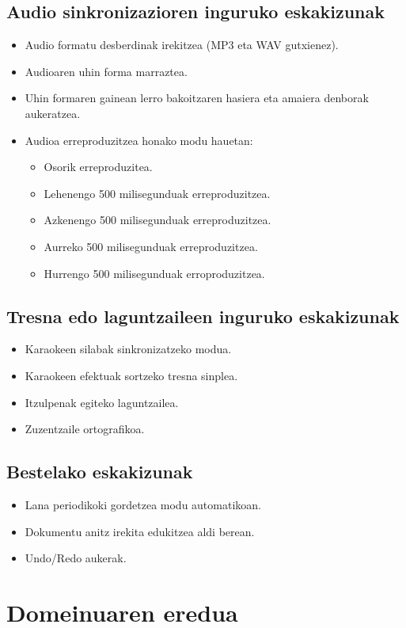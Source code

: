 \subsection{Audio sinkronizazioren inguruko eskakizunak}
\begin{itemize}
\item Audio formatu desberdinak irekitzea (MP3 eta WAV gutxienez).
\item Audioaren uhin forma marraztea.
\item Uhin formaren gainean lerro bakoitzaren hasiera eta amaiera denborak aukeratzea.
\item Audioa erreproduzitzea honako modu hauetan:
	\begin{itemize}
	\item Osorik erreproduzitea.
	\item Lehenengo 500 milisegunduak erreproduzitzea.
	\item Azkenengo 500 milisegunduak erreproduzitzea.
	\item Aurreko 500 milisegunduak erreproduzitzea.
	\item Hurrengo 500 milisegunduak erroproduzitzea.
	\end{itemize}
\end{itemize}
\subsection{Tresna edo laguntzaileen inguruko eskakizunak}
\begin{itemize}
\item Karaokeen silabak sinkronizatzeko modua.
\item Karaokeen efektuak sortzeko tresna sinplea.
\item Itzulpenak egiteko laguntzailea.
\item Zuzentzaile ortografikoa.
\end{itemize}
\subsection{Bestelako eskakizunak}
\begin{itemize}
\item Lana periodikoki gordetzea modu automatikoan.
\item Dokumentu anitz irekita edukitzea aldi berean.
\item Undo/Redo aukerak.
\end{itemize}
\section{Domeinuaren eredua}

